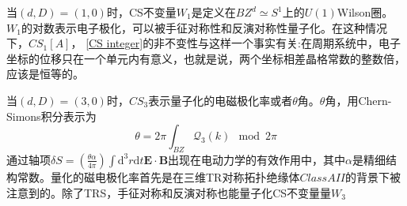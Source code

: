 \documentclass[a4paper]{article}
\numberwithin{equation}{subsection}
\begin{document}
当$(d,D)=(1,0)$时，CS不变量$W_1$是定义在$BZ^d\simeq S^1$上的$U(1)$Wilson圈。$W_1$的对数表示电子极化，可以被手征对称性和反演对称性量子化。在这种情况下，$CS_1[A]$， \eqref{CS integer}的非不变性与这样一个事实有关:在周期系统中，电子坐标的位移只在一个单元内有意义，也就是说，两个坐标相差晶格常数的整数倍，应该是恒等的。

当$(d,D)=(3,0)$时，$CS_3$表示量子化的电磁极化率或者$\theta$角。$\theta$角，用Chern-Simons积分表示为
\begin{equation}
    \theta=2\pi\int_{BZ}\mathcal{Q}_3(k)\mod{2\pi}
\end{equation}
通过轴项$\delta S=(\frac{\theta\alpha}{4\pi})\int\mathrm{d}^3r\mathrm{d}t\mathbf{E}\cdot\mathbf{B}$出现在电动力学的有效作用中，其中$\alpha$是精细结构常数。量化的磁电极化率首先是在三维TR对称拓扑绝缘体$Class AII$的背景下被注意到的。除了TRS，手征对称和反演对称也能量子化CS不变量量$W_3$
\end{document}
